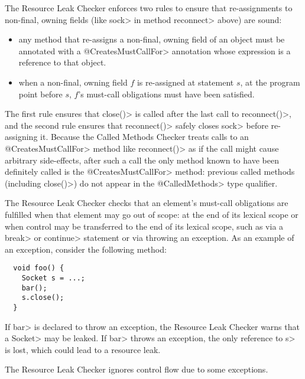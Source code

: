 The Resource Leak Checker enforces two rules to ensure that re-assignments
to non-final, owning fields (like \<sock> in method \<reconnect> above) are
sound:
\begin{itemize}
\item any method that re-assigns a non-final, owning field of an object
  must be annotated with a \<@CreatesMustCallFor> annotation
  whose expression is a reference to that object.
\item when a non-final, owning field $f$ is re-assigned at statement $s$,
  at the program point before $s$, $f$'s must-call obligations must have been satisfied.
\end{itemize}
\noindent
The first rule ensures that \<close()> is called after the last call
to \<reconnect()>, and the second rule ensures that \<reconnect()>
safely closes \<sock> before re-assigning it. Because the Called Methods Checker
treats calls to an \<@CreatesMustCallFor> method like \<reconnect()> as if the call might
cause arbitrary side-effects, after such a call the only method known to have been
definitely called is the \<@CreatesMustCallFor> method: previous called
methods (including \<close()>) do not appear in the \<@CalledMethods> type qualifier.




The Resource Leak Checker checks that an element's must-call obligations
are fulfilled when that element may go out of scope: at the end of its
lexical scope or when control may be transferred to the end of its lexical
scope, such as via a \<break> or \<continue> statement or via throwing an
exception.  As an example of an exception, consider the following method:

\begin{verbatim}
  void foo() {
    Socket s = ...;
    bar();
    s.close();
  }
\end{verbatim}

If \<bar> is declared to throw an exception, the Resource Leak Checker
warns that a \<Socket> may be leaked.  If \<bar> throws an exception, the
only reference to \<s> is lost, which could lead to a resource leak.

The Resource Leak Checker ignores control flow due to some exceptions.

